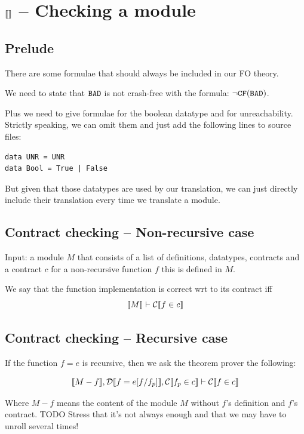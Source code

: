 \documentclass[preprint]{sigplanconf}
\begin{document}
\section{$\llbracket  \rrbracket$ -- Checking a module}

\subsection{Prelude}
There are some formulae that should always be included in our FO theory.

We need to state that $\texttt{BAD}$ is not crash-free with the formula:
$\lnot \texttt{CF}(\texttt{BAD})$.


Plus we need to give formulae for the boolean datatype and for
 unreachability. Strictly speaking, we can omit them and just add the
following lines to source files:
\begin{verbatim}
data UNR = UNR
data Bool = True | False
\end{verbatim}
But given that those datatypes are used by our translation, we can
just directly include their translation every time we translate a
module.

\subsection{Contract checking -- Non-recursive case}
Input: a module $M$ that consists of a list of definitions, datatypes,
contracts and a contract $c$ for a non-recursive function $f$ this is
defined in $M$.

We say that the function implementation is correct wrt to its contract
iff $$\llbracket M \rrbracket \vdash \mathcal{C} \llbracket f \in c \rrbracket$$

\subsection{Contract checking -- Recursive case}\label{sec:recursiveContracts}
If the function $f=e$ is recursive, then we ask the theorem prover the
following:

$$\llbracket M - f \rrbracket, \mathcal{D} \llbracket f=e[f/f_p] \rrbracket, \mathcal{C} \llbracket f_p \in c \rrbracket \vdash \mathcal{C} \llbracket f \in c \rrbracket$$

Where $M - f $ means the content of the module $M$ without $f$'s
definition and $f$'s contract. TODO Stress that it's not always enough
and that we may have to unroll several times!
\end{document}
